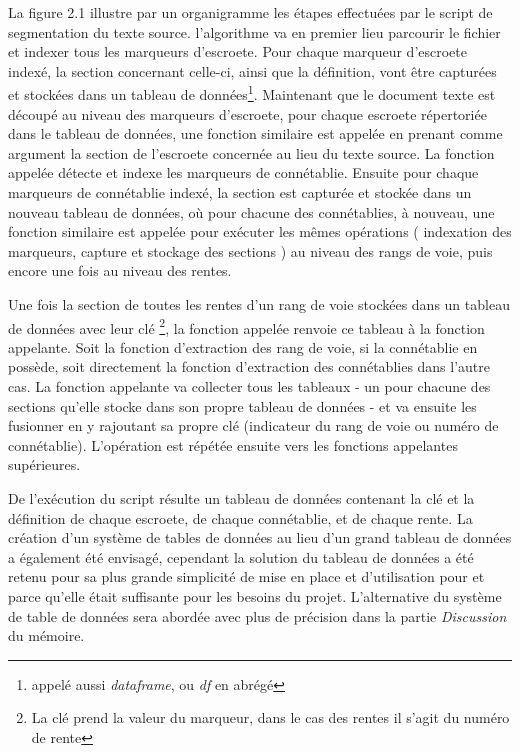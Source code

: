 La figure 2.1 illustre par un organigramme les étapes effectuées par le script de segmentation du texte source.
l'algorithme va en premier lieu parcourir le fichier et indexer tous les marqueurs d'escroete. Pour chaque marqueur d'escroete indexé, la section concernant celle-ci, ainsi que la définition, vont être capturées et stockées dans un tableau de données\footnote{appelé aussi \textit{dataframe}, ou \textit{df} en abrégé}. Maintenant que le document texte est découpé au niveau des marqueurs d'escroete, pour chaque escroete répertoriée dans le tableau de données, une fonction similaire est appelée  en prenant comme argument la section de l'escroete concernée au lieu du texte source.
La fonction appelée détecte et indexe les marqueurs de connétablie. 
Ensuite pour chaque marqueurs de connétablie indexé, la section est capturée et stockée dans un nouveau tableau de données, où pour chacune des connétablies, à nouveau, une fonction similaire est appelée pour exécuter les mêmes opérations ( indexation des marqueurs, capture et stockage des sections ) au niveau des rangs de voie, puis encore une fois au niveau des rentes.

Une fois la section de toutes les rentes d'un rang de voie stockées dans un tableau de données avec leur clé
\footnote{La clé prend la valeur du marqueur, dans le cas des rentes il s'agit du numéro de rente}, 
la fonction appelée renvoie ce tableau à la fonction appelante. Soit la fonction d'extraction des rang de voie, si la connétablie en possède, soit directement la fonction d'extraction des connétablies dans l'autre cas. La fonction appelante va collecter tous les tableaux - un pour chacune des sections qu'elle stocke dans son propre tableau de données - et va ensuite les fusionner en y rajoutant sa propre clé (indicateur du rang de voie ou numéro de connétablie). L'opération est répétée ensuite vers les fonctions appelantes supérieures.

De l'exécution du script résulte un tableau de données contenant la clé et la définition de chaque escroete, de chaque connétablie, et de chaque rente. La création d'un système de tables de données au lieu d'un grand tableau de données a également été envisagé, cependant la solution du tableau de données a été retenu pour sa plus grande simplicité de mise en place et d'utilisation pour et parce qu'elle était suffisante pour les besoins du projet. L'alternative du système de table de données sera abordée avec plus de précision  dans la partie \textit{Discussion} du mémoire.


